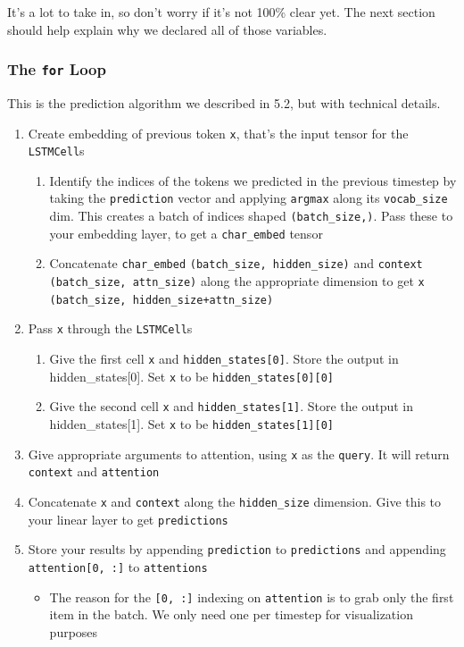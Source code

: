 \documentclass{article}
\newcommand{\ttt}[1]{\texttt{#1}}
\begin{document}
It's a lot to take in, so don't worry if it's not 100\% clear yet. The next section should help explain why we declared all of those variables.

\newpage

\subsubsection{The \ttt{for} Loop}

This is the prediction algorithm we described in 5.2, but with technical details. 

\begin{enumerate}
    \item Create embedding of previous token \ttt{x}, that's the input tensor for the \ttt{LSTMCell}s
        \begin{enumerate}
            \item Identify the indices of the tokens we predicted in the previous timestep by taking the \ttt{prediction} vector and applying \ttt{argmax} along its \ttt{vocab\_size} dim. This creates a batch of indices shaped \ttt{(batch\_size,)}. Pass these to your embedding layer, to get a \ttt{char\_embed} tensor
            \item Concatenate \ttt{char\_embed}
            \ttt{(batch\_size, hidden\_size)} and \ttt{context} \ttt{(batch\_size, attn\_size)} along the appropriate dimension to get \ttt{x} \ttt{(batch\_size, hidden\_size+attn\_size)}
        \end{enumerate}
    \item Pass \ttt{x} through the \ttt{LSTMCell}s
        \begin{enumerate}
            \item Give the first cell \ttt{x} and \ttt{hidden\_states[0]}. Store the output in {hidden\_states[0]}. Set \ttt{x} to be \ttt{hidden\_states[0][0]}
            \item Give the second cell \ttt{x} and \ttt{hidden\_states[1]}. Store the output in {hidden\_states[1]}. Set \ttt{x} to be \ttt{hidden\_states[1][0]}
        \end{enumerate}
    \item Give appropriate arguments to attention, using \ttt{x} as the \ttt{query}. It will return \ttt{context} and \ttt{attention}
    \item Concatenate \ttt{x} and \ttt{context} along the \ttt{hidden\_size} dimension. Give this to your linear layer to get \ttt{predictions}
    \item Store your results by appending \ttt{prediction} to \ttt{predictions} and appending \ttt{attention[0, :]} to \ttt{attentions}
    \begin{itemize}
        \item The reason for the \ttt{[0, :]} indexing on \ttt{attention} is to grab only the first item in the batch. We only need one per timestep for visualization purposes
    \end{itemize}
\end{enumerate}
\end{document}
